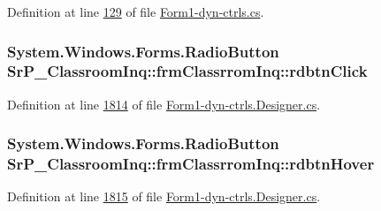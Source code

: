 \-Definition at line \hyperlink{_form1-dyn-ctrls_8cs_source_l00129}{129} of file \hyperlink{_form1-dyn-ctrls_8cs_source}{\-Form1-\/dyn-\/ctrls.\-cs}.

\hypertarget{class_sr_p___classroom_inq_1_1frm_classrrom_inq_a116a0f948fdc7187ae7dc028026eec59}{
\subsubsection[{rdbtn\-Click}]{\setlength{\rightskip}{0pt plus 5cm}\-System.\-Windows.\-Forms.\-Radio\-Button {\bf \-Sr\-P\-\_\-\-Classroom\-Inq\-::frm\-Classrrom\-Inq\-::rdbtn\-Click}}}
\label{class_sr_p___classroom_inq_1_1frm_classrrom_inq_a116a0f948fdc7187ae7dc028026eec59}


\-Definition at line \hyperlink{_form1-dyn-ctrls_8_designer_8cs_source_l01814}{1814} of file \hyperlink{_form1-dyn-ctrls_8_designer_8cs_source}{\-Form1-\/dyn-\/ctrls.\-Designer.\-cs}.

\hypertarget{class_sr_p___classroom_inq_1_1frm_classrrom_inq_a2bee4d450744662c189d99c17658dac7}{
\subsubsection[{rdbtn\-Hover}]{\setlength{\rightskip}{0pt plus 5cm}\-System.\-Windows.\-Forms.\-Radio\-Button {\bf \-Sr\-P\-\_\-\-Classroom\-Inq\-::frm\-Classrrom\-Inq\-::rdbtn\-Hover}}}
\label{class_sr_p___classroom_inq_1_1frm_classrrom_inq_a2bee4d450744662c189d99c17658dac7}


\-Definition at line \hyperlink{_form1-dyn-ctrls_8_designer_8cs_source_l01815}{1815} of file \hyperlink{_form1-dyn-ctrls_8_designer_8cs_source}{\-Form1-\/dyn-\/ctrls.\-Designer.\-cs}.

